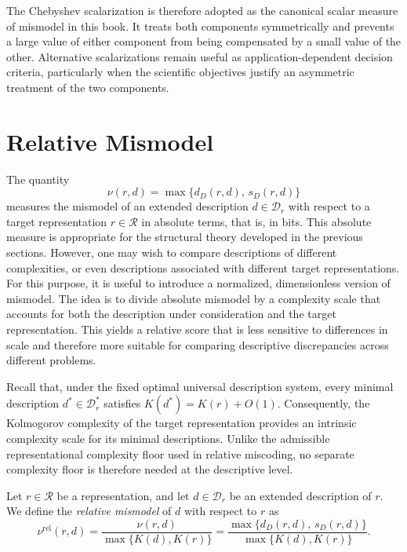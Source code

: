 The Chebyshev scalarization is therefore adopted as the canonical scalar measure of mismodel in this book. It treats both components symmetrically and prevents a large value of either component from being compensated by a small value of the other. Alternative scalarizations remain useful as application-dependent decision criteria,
particularly when the scientific objectives justify an asymmetric treatment of the two components.

%
%

\section{Relative Mismodel}
\label{sec:relative_mismodel}

The quantity
\[
\nu(r,d)=\max\{d_D(r,d),\,s_D(r,d)\}
\]
measures the mismodel of an extended description $d\in\mathcal D_r$ with respect to a target representation $r\in\mathcal R$ in absolute terms, that is, in bits. This absolute measure is appropriate for the structural theory developed in the previous sections. However, one may wish to compare descriptions of different complexities, or even descriptions associated with different target representations. For this purpose, it is useful to introduce a normalized, dimensionless version of mismodel. The idea is to divide absolute mismodel by a complexity scale that accounts for both the description under consideration and the target representation. This yields a relative score that is less sensitive to differences in scale and therefore more suitable for comparing descriptive discrepancies across different problems.

Recall that, under the fixed optimal universal description system, every minimal description $d^\ast\in\mathcal D_r^\ast$ satisfies $K(d^\ast) = K(r) + O(1)$. Consequently, the Kolmogorov complexity of the target representation provides an intrinsic complexity scale for its minimal descriptions. Unlike the admissible representational complexity floor used in relative miscoding, no separate complexity floor is therefore needed at the descriptive level.

\begin{definition}
\label{def:relative_mismodel}
Let $r\in\mathcal R$ be a representation, and let $d\in\mathcal D_r$ be an extended description of $r$. We define the \emph{relative mismodel} of $d$ with respect to $r$ as
\[
\nu^{\mathrm{rel}}(r,d) = \frac{\nu(r,d)}{\max\{K(d),K(r)\}} =
\frac{\max\{d_D(r,d),\,s_D(r,d)\}} {\max\{K(d),K(r)\}}.
\]
\end{definition}

